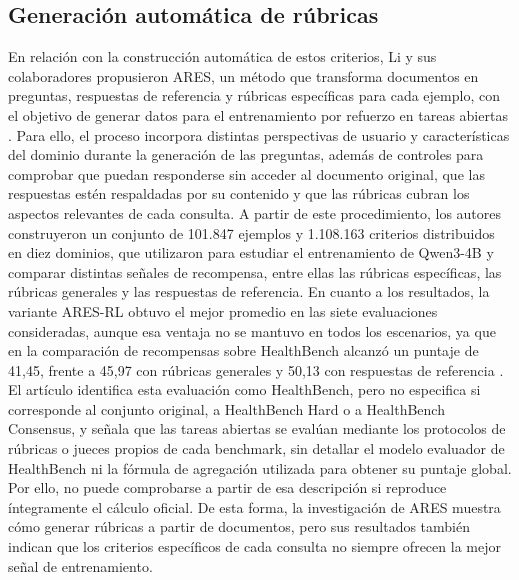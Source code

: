 \subsection{Generación automática de rúbricas}
En relación con la construcción automática de estos criterios, Li y sus colaboradores propusieron ARES, un método que transforma documentos en preguntas, respuestas de referencia y rúbricas específicas para cada ejemplo, con el objetivo de generar datos para el entrenamiento por refuerzo en tareas abiertas \cite{li2026ares}. Para ello, el proceso incorpora distintas perspectivas de usuario y características del dominio durante la generación de las preguntas, además de controles para comprobar que puedan responderse sin acceder al documento original, que las respuestas estén respaldadas por su contenido y que las rúbricas cubran los aspectos relevantes de cada consulta. A partir de este procedimiento, los autores construyeron un conjunto de 101.847 ejemplos y 1.108.163 criterios distribuidos en diez dominios, que utilizaron para estudiar el entrenamiento de Qwen3-4B y comparar distintas señales de recompensa, entre ellas las rúbricas específicas, las rúbricas generales y las respuestas de referencia. En cuanto a los resultados, la variante ARES-RL obtuvo el mejor promedio en las siete evaluaciones consideradas, aunque esa ventaja no se mantuvo en todos los escenarios, ya que en la comparación de recompensas sobre HealthBench alcanzó un puntaje de 41,45, frente a 45,97 con rúbricas generales y 50,13 con respuestas de referencia \cite{li2026ares}. El artículo identifica esta evaluación como HealthBench, pero no especifica si corresponde al conjunto original, a HealthBench Hard o a HealthBench Consensus, y señala que las tareas abiertas se evalúan mediante los protocolos de rúbricas o jueces propios de cada benchmark, sin detallar el modelo evaluador de HealthBench ni la fórmula de agregación utilizada para obtener su puntaje global. Por ello, no puede comprobarse a partir de esa descripción si reproduce íntegramente el cálculo oficial. De esta forma, la investigación de ARES muestra cómo generar rúbricas a partir de documentos, pero sus resultados también indican que los criterios específicos de cada consulta no siempre ofrecen la mejor señal de entrenamiento.

